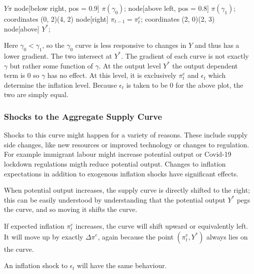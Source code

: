 \documentclass[12pt]{report}
\begin{document}
\begin{flushleft}
\begin{simpleplot}{\(Y\)}{\(\pi\)}
    node[below right, pos = 0.9] {\(\pi(\gamma_0)\)};
    node[above left, pos = 0.8] {\(\pi(\gamma_1)\)};
     coordinates {(0, 2)(4, 2)}
    node[right] {\(\pi_{t - 1} = \pi^e_t\)};
     coordinates {(2, 0)(2, 3)}
    node[above] {\(Y^*\)};
\end{simpleplot}

Here \(\gamma_0 < \gamma_1\), so the \(\gamma_0\) curve is less responsive to
changes in \(Y\) and thus has a lower gradient. The two intersect at \(Y^*\).
The gradient of each curve is not exactly \(\gamma\) but rather some function
of \(\gamma\). At the output level \(Y^*\) the output dependent term is \(0\)
so \(\gamma\) has no effect. At this level, it is exclusively \(\pi^e_t\) and
\(\epsilon_t\) which determine the inflation level. Because \(\epsilon_t\) is
taken to be \(0\) for the above plot, the two are simply equal.

\subsubsection*{Shocks to the Aggregate Supply Curve}
Shocks to this curve might happen for a variety of reasons. These include
supply side changes, like new resources or improved technology or changes to
regulation. For example immigrant labour might increase potential output or 
Covid-19 lockdown regulations migth reduce potential output. Changes to
inflation expectations in addition to exogenous inflation shocks have
significant effects. \par
When potential output increases, the supply curve is directly shifted to the
right; this can be easily understood by understanding that the potential output
\(Y^*\) pegs the curve, and so moving it shifts the curve. \par
If expected inflation \(\pi^e_t\) increases, the curve will shift upward or
equivalently left. It will move up by exactly \(\Delta\pi^e\), again because
the point \((\pi^e_t, Y^*)\) always lies on the curve. \par
An inflation shock to \(\epsilon_t\) will have the same behaviour.

\end{flushleft}
\end{document}
